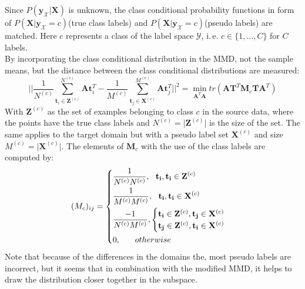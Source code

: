 Since $P(\mathbf{y}_\mathcal{X}\vert \mathbf{X})$ is unknown, the class conditional probability functions in form of $P(\mathbf{X}\vert \mathbf{y}_\mathcal{X}=c)$(true class labels) and $P(\mathbf{X}\vert \mathbf{y}_\mathcal{X}=c)$(pseudo labels) are matched.
Here $c$ represents a class of the label space $\mathcal{Y}$, i.\,e. $c\in \{1,\dots,C\}$ for $C$ labels.\cite{Long.}\\
By incorporating the class conditional distribution in the \acl{MMD}, not the sample means, but the distance between the class conditional distributions are measured:\cite{Long.}
\begin{equation}\label{EqJDAConditionalOpt}
\bigg|\bigg| \frac{1}{N^{(c)}} \sum_{\mathbf{t}_i \in \mathbf{Z}^{(c)}}^{N^{(c)}}\mathbf{A}\mathbf{t}_i^T- \frac{1}{M^{(c)}} \sum_{\mathbf{t}_j \in \mathbf{X}^{(c)}}^{M^{(c)}}\mathbf{A}\mathbf{t}_j^T \bigg|\bigg|^2 = \min_{\mathbf{A}^T\mathbf{A}} tr(\mathbf{A}\mathbf{T}^T\mathbf{M}_c\mathbf{T}\mathbf{A}^T)
\end{equation}
With  $\mathbf{Z}^{(c)}$ as the set of examples belonging to class $c$ in the source data, where the points have the true class labels and $N^{(c)} = \vert\mathbf{Z}^{(c)}\vert$ is the size of the set.
The same applies to the target domain but with a pseudo label set $\mathbf{X}^{(c)}$ and size $M^{(c)} = \vert\mathbf{X}^{(c)}\vert$.
The elements of $\mathbf{M}_c$ with the use of the class labels are computed by: \cite{Long.}
\begin{equation}\label{EqJDAMMDPseudoMatrix}
(M_c)_{ij}= \begin{dcases}
\frac{1}{N^{(c)} N^{(c)} },\>\>\> \mathbf{t_i},\mathbf{t_i} \in \mathbf{Z}^{(c)} \\
\frac{1}{M^{(c)}  M^{(c)}  },\>\>\> \mathbf{t_i},\mathbf{t_i} \in \mathbf{X}^{(c)} \\
\frac{-1}{N ^{(c)} M ^{(c)} }, \begin{cases}
\mathbf{t_i} \in \mathbf{Z}^{(c)}, \mathbf{t_j} \in \mathbf{X}^{(c)}\\
\mathbf{t_j} \in \mathbf{Z}^{(c)}, \mathbf{t_i} \in \mathbf{X}^{(c)}\\
\end{cases}\\
0,\>\>\>\>\>\>\>\> otherwise
\end{dcases}
\end{equation}
Note that because of the differences in the domains the, most pseudo labels are incorrect, but it seems that in combination with the modified \acs{MMD}, it helps to draw the distribution closer together in the subspace.\cite{Long.}\\
